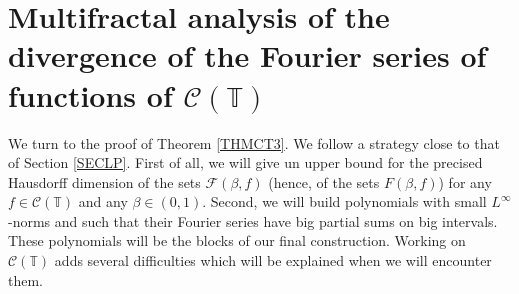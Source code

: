 \documentclass[11pt,a4paper]{amsart}
\theoremstyle{plain}
\begin{document}
\section{Multifractal analysis of the divergence of the Fourier series of functions of $\mathcal C(\mathbb T)$}\label{SECCT}
We turn to the proof of Theorem \ref{THMCT3}. We follow a strategy close to that of Section \ref{SECLP}. First of all, 
we will give un upper bound for 
the precised Hausdorff dimension of the sets $\mathcal F(\beta,f)$ (hence, of the sets $F(\beta,f)$) for
any $f\in\mathcal C({\mathbb T})$ and any $\beta\in(0,1)$. Second, we will build polynomials with small $L^\infty$-norms
and such that their Fourier series have big partial sums on big intervals. 
These polynomials will be the blocks of our final construction. Working on $\mathcal C({\mathbb T})$ adds several difficulties which will be explained
when we will encounter them.
\end{document}
